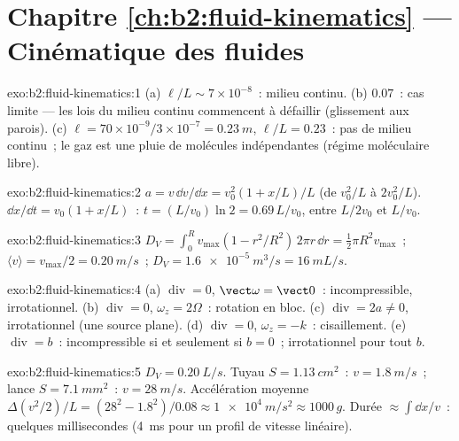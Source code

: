 \section*{Chapitre \ref{ch:b2:fluid-kinematics} --- Cinématique des fluides}

\begin{solution}{exo:b2:fluid-kinematics:1}
(a) $\ell/L \sim 7 \times 10^{-8}$~: milieu continu. (b) $0.07$~: cas limite --- les
lois du milieu continu commencent à défaillir (glissement aux parois). (c) $\ell = 70 \times 10^{-9}
/3 \times 10^{-7} = \qty{0.23}{m}$, $\ell/L = 0.23$~: pas de milieu continu~; le gaz est
une pluie de molécules indépendantes (régime moléculaire libre).
\end{solution}

\begin{solution}{exo:b2:fluid-kinematics:2}
$a = v\,\dd v/\dd x = v_0^2(1 + x/L)/L$ (de $v_0^2/L$ à $2v_0^2/L$).
$\dd x/\dd t = v_0(1 + x/L)$~: $t = (L/v_0)\ln2 = 0.69\,L/v_0$, entre
$L/2v_0$ et $L/v_0$.
\end{solution}

\begin{solution}{exo:b2:fluid-kinematics:3}
$D_V = \int_0^Rv_{\max}(1 - r^2/R^2)\,2\pi r\,\dd r = \tfrac12\pi R^2v_{\max}$~;
$\langle v\rangle = v_{\max}/2 = \qty{0.20}{m/s}$~; $D_V = \qty{1.6e-5}{m^3/s} =
\qty{16}{mL/s}$.
\end{solution}

\begin{solution}{exo:b2:fluid-kinematics:4}
(a) $\operatorname{div} = 0$, $\vect\omega = \vect 0$~: incompressible,
irrotationnel. (b) $\operatorname{div} = 0$, $\omega_z = 2\Omega$~: rotation
en bloc. (c) $\operatorname{div} = 2a \ne 0$, irrotationnel (une source
plane). (d) $\operatorname{div} = 0$, $\omega_z = -k$~: cisaillement. (e)
$\operatorname{div} = b$~: incompressible si et seulement si $b = 0$~; irrotationnel pour
tout $b$.
\end{solution}

\begin{solution}{exo:b2:fluid-kinematics:5}
$D_V = \qty{0.20}{L/s}$. Tuyau $S = \qty{1.13}{cm^2}$~: $v = \qty{1.8}{m/s}$~; lance
$S = \qty{7.1}{mm^2}$~: $v = \qty{28}{m/s}$. Accélération moyenne $\Delta(v^2/2)/L
= (28^2 - 1.8^2)/0.08 \approx \qty{1e4}{m/s^2} \approx 1000\,g$. Durée $\approx
\int\dd x/v$~: quelques millisecondes (\qty{4}{ms} pour un profil de vitesse linéaire).
\end{solution}

